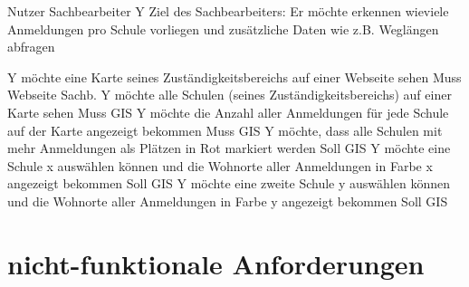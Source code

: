 Nutzer Sachbearbeiter Y
Ziel des Sachbearbeiters: Er möchte erkennen wieviele Anmeldungen pro Schule vorliegen und zusätzliche Daten wie z.B. Weglängen abfragen

Y möchte eine Karte seines Zuständigkeitsbereichs auf einer Webseite sehen	Muss	Webseite Sachb.
Y möchte alle Schulen (seines Zuständigkeitsbereichs) auf einer Karte sehen	Muss	GIS
Y möchte die Anzahl aller Anmeldungen für jede Schule auf der Karte angezeigt bekommen	Muss	GIS
Y möchte, dass alle Schulen mit mehr Anmeldungen als Plätzen in Rot markiert werden	Soll	GIS
Y möchte eine Schule x auswählen können und die Wohnorte aller Anmeldungen in Farbe x angezeigt bekommen	Soll	GIS
Y möchte eine zweite Schule y auswählen können und die Wohnorte aller Anmeldungen in Farbe y angezeigt bekommen 	Soll	GIS

\section{nicht-funktionale Anforderungen}




